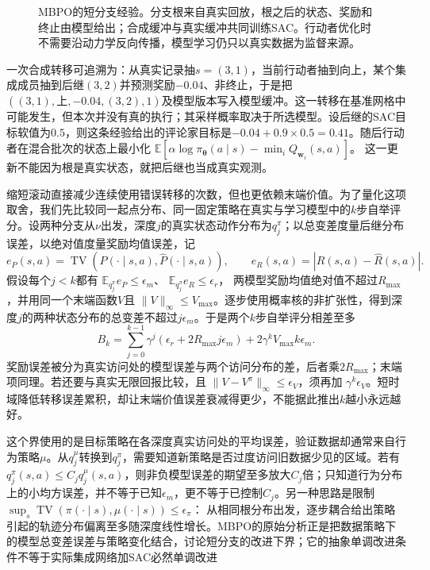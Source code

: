 \begin{figure}[t]
  \centering
  
  \caption{MBPO的短分支经验。分支根来自真实回放，根之后的状态、奖励和终止由模型给出；合成缓冲与真实缓冲共同训练SAC。行动者优化时不需要沿动力学反向传播，模型学习仍只以真实数据为监督来源。}
  \label{fig:rl-learning-mbpo}
\end{figure}

一次合成转移可追溯为：从真实记录抽$s=(3,1)$，当前行动者抽到向上，某个集成成员抽到后继$(3,2)$并预测奖励$-0.04$、非终止，于是把
$((3,1),\text{上},-0.04,(3,2),1)$及模型版本写入模型缓冲。这一转移在基准网格中可能发生，但本次并没有真的执行；其采样概率取决于所选模型。设后继的SAC目标软值为$0.5$，则这条经验给出的评论家目标是$-0.04+0.9\times0.5=0.41$。随后行动者在混合批次的状态上最小化
$\mathbb E[\alpha\log\pi_{\bm\theta}(a\mid s)-\min_iQ_{\bm w_i}(s,a)]$。
这一更新不能因为根是真实状态，就把后继也当成真实观测。

缩短滚动直接减少连续使用错误转移的次数，但也更依赖末端价值。为了量化这项取舍，我们先比较同一起点分布、同一固定策略在真实与学习模型中的$k$步自举评分。设两种分支从$\nu$出发，深度$j$的真实状态动作分布为$q_j^\pi$；以总变差度量后继分布误差，以绝对值度量奖励均值误差，记
\[
 e_P(s,a)=\operatorname{TV}(P(\cdot\mid s,a),\widehat P(\cdot\mid s,a)),
 \qquad e_R(s,a)=|R(s,a)-\widehat R(s,a)|.
\]
假设每个$j<k$都有
$\mathbb E_{q_j^\pi}e_P\leq\epsilon_m$、
$\mathbb E_{q_j^\pi}e_R\leq\epsilon_r$，
两模型奖励均值绝对值不超过$R_{\max}$，并用同一个末端函数$V$且
$\|V\|_\infty\leq V_{\max}$。逐步使用概率核的非扩张性，得到深度$j$的两种状态分布的总变差不超过$j\epsilon_m$。于是两个$k$步自举评分相差至多
\begin{equation}
 B_k=
   \sum_{j=0}^{k-1}\gamma^j
       (\epsilon_r+2R_{\max}j\epsilon_m)
       +2\gamma^kV_{\max}k\epsilon_m.
 \label{eq:rl-learning-short-model-bound}
\end{equation}
奖励误差被分为真实访问处的模型误差与两个访问分布的差，后者乘$2R_{\max}$；末端项同理。若还要与真实无限回报比较，且
$\|V-V^\pi\|_\infty\leq\epsilon_V$，须再加
$\gamma^k\epsilon_V$。短时域降低转移误差累积，却让末端价值误差衰减得更少，不能据此推出$k$越小永远越好。

这个界使用的是目标策略在各深度真实访问处的平均误差，验证数据却通常来自行为策略$\mu$。从$q_j^\mu$转换到$q_j^\pi$，需要知道新策略是否过度访问旧数据少见的区域。若有
$q_j^\pi(s,a)\leq C_jq_j^\mu(s,a)$，则非负模型误差的期望至多放大$C_j$倍；只知道行为分布上的小均方误差，并不等于已知$\epsilon_m$，更不等于已控制$C_j$。另一种思路是限制
$\sup_s\operatorname{TV}(\pi(\cdot\mid s),\mu(\cdot\mid s))\leq\epsilon_\pi$：
从相同根分布出发，逐步耦合给出策略引起的轨迹分布偏离至多随深度线性增长。MBPO的原始分析正是把数据策略下的模型总变差误差与策略变化结合，讨论短分支的改进下界；它的抽象单调改进条件不等于实际集成网络加SAC必然单调改进

